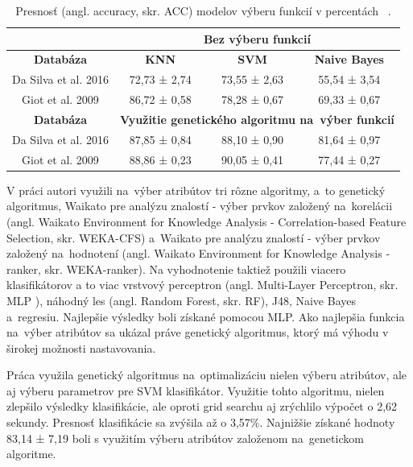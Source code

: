 \documentclass[runningheads]{llncs}
\begin{document}
\begin{table}[]
\centering
\caption{Presnosť (angl. accuracy, skr. ACC) modelov výberu funkcií v percentách ~\cite{ref_nascimento}.}\label{tab_vyber_funkci}
\begin{tabular}{|c|c|c|c|}
\hline
                     & \multicolumn{3}{c|}{\textbf{Bez výberu funkcií}}                     \\ \hline
\textbf{Databáza}    & \textbf{KNN}          & \textbf{SVM}          & \textbf{Naive Bayes} \\ \hline
Da Silva et al. 2016 & 72,73 ± 2,74           & 73,55 ± 2,63           & 55,54 ± 3,54           \\ \hline
Giot et al. 2009     & 86,72 ± 0,58           & 78,28 ± 0,67           & 69,33 ± 0,67          \\ \hline
\textbf{Databáza}    & \multicolumn{3}{c|}{\textbf{Využitie genetického algoritmu na~výber funkcií}} \\ \hline
Da Silva et al. 2016 & 87,85 ± 0,84            & 88,10 ± 0,90           & 81,64 ± 0,97          \\ \hline
Giot et al. 2009     & 88,86 ± 0,23           & 90,05 ± 0,41            & 77,44 ± 0,27          \\ \hline
\end{tabular}
\end{table}


V práci \cite{ref_babatunde} autori využili na~výber atribútov tri rôzne algoritmy, a~to 
genetický algoritmus, Waikato pre analýzu znalostí - výber prvkov založený na~korelácii (angl. Waikato Environment for Knowledge Analysis - Correlation-based Feature Selection, skr. WEKA-CFS) a~Waikato pre analýzu znalostí - výber prvkov založený na~hodnotení (angl. Waikato Environment for Knowledge Analysis - ranker, skr. WEKA-ranker). Na vyhodnotenie taktiež použili viacero klasifikátorov
a to viac vrstvový perceptron (angl. Multi-Layer Perceptron, skr. MLP ), náhodný les (angl. Random Forest, skr. RF), J48, Naive Bayes a~regresiu. Najlepšie výsledky 
boli získané pomocou MLP. Ako najlepšia funkcia na~výber atribútov sa ukázal práve genetický algoritmus,
ktorý má výhodu v širokej možnosti nastavovania.

Práca \cite{ref_zhao} využila genetický algoritmus na~optimalizáciu nielen výberu atribútov, 
ale aj výberu parametrov pre SVM klasifikátor. Využitie tohto algoritmu, nielen zlepšilo výsledky klasifikácie, 
ale oproti  grid searchu aj zrýchlilo výpočet o 2,62 sekundy.
Presnosť klasifikácie sa zvýšila až o 3,57\%. Najnižšie 
získané hodnoty 83,14 ± 7,19 boli s využitím výberu atribútov založenom na~genetickom algoritme.
\end{document}
